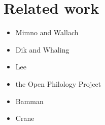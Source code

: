 


\section{Related work}

\begin{itemize}
\item Mimno and Wallach
\item Dik and Whaling
\item Lee
\item the Open Philology Project
\item Bamman
\item Crane
\end{itemize}